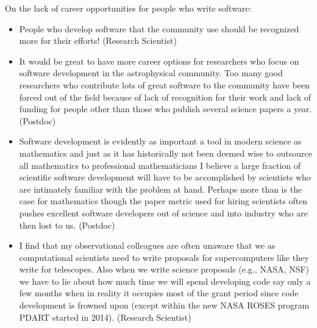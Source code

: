 \begin{appendix}
\begin{itemize}
\end{itemize}

On the lack of career opportunities for people who write software:

\begin{itemize}
\item{People who develop software that the community use should be recognized more for their efforts! (Research Scientist)}
\item{It would be great to have more career options for researchers who focus on software development in the astrophysical community.  Too many good researchers who contribute lots of great software to the community have been forced out of the field because of lack of recognition for their work and lack of funding for people other than those who publish several science papers a year. (Postdoc)}
\item{Software development is evidently as important a tool in modern science as mathematics and just as it has historically not been deemed wise to outsource all mathematics to professional mathematicians I believe a large fraction of scientific software development will have to be accomplished by scientists who are intimately familiar with the problem at hand. Perhaps more than is the case for mathematics though the paper metric used for hiring scientists often pushes excellent software developers out of science and into industry who are then lost to us. (Postdoc)}
\item{I find that my observational colleagues are often unaware that we as computational scientists need to write proposals for supercomputers like they write for telescopes.  Also when we write science proposals (e.g., NASA, NSF) we have to lie about how much time we will spend developing code say only a few months when in reality it occupies most of the grant period since code development is frowned upon (except within the new NASA ROSES program PDART started in 2014). (Research Scientist)}
\end{itemize}

\end{appendix}
  